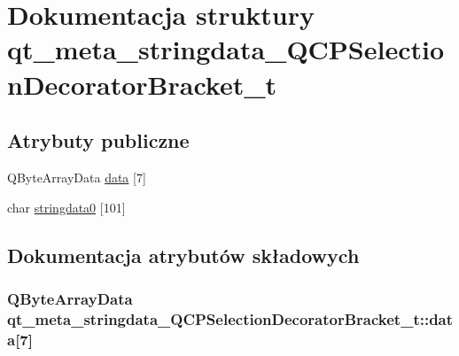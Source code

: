 \hypertarget{structqt__meta__stringdata___q_c_p_selection_decorator_bracket__t}{}\section{Dokumentacja struktury qt\+\_\+meta\+\_\+stringdata\+\_\+\+Q\+C\+P\+Selection\+Decorator\+Bracket\+\_\+t}
\label{structqt__meta__stringdata___q_c_p_selection_decorator_bracket__t}
\subsection*{Atrybuty publiczne}
\begin{DoxyCompactItemize}
\item 
Q\+Byte\+Array\+Data \hyperlink{structqt__meta__stringdata___q_c_p_selection_decorator_bracket__t_a3b64cfff2eed66fb56c3b3a8d04dbbbe}{data} \mbox{[}7\mbox{]}
\item 
char \hyperlink{structqt__meta__stringdata___q_c_p_selection_decorator_bracket__t_a9fdc0589eeaa19fcf4e22afbdbd579cd}{stringdata0} \mbox{[}101\mbox{]}
\end{DoxyCompactItemize}


\subsection{Dokumentacja atrybutów składowych}
\subsubsection[{\texorpdfstring{data}{data}}]{\setlength{\rightskip}{0pt plus 5cm}Q\+Byte\+Array\+Data qt\+\_\+meta\+\_\+stringdata\+\_\+\+Q\+C\+P\+Selection\+Decorator\+Bracket\+\_\+t\+::data\mbox{[}7\mbox{]}}\hypertarget{structqt__meta__stringdata___q_c_p_selection_decorator_bracket__t_a3b64cfff2eed66fb56c3b3a8d04dbbbe}{}\label{structqt__meta__stringdata___q_c_p_selection_decorator_bracket__t_a3b64cfff2eed66fb56c3b3a8d04dbbbe}
